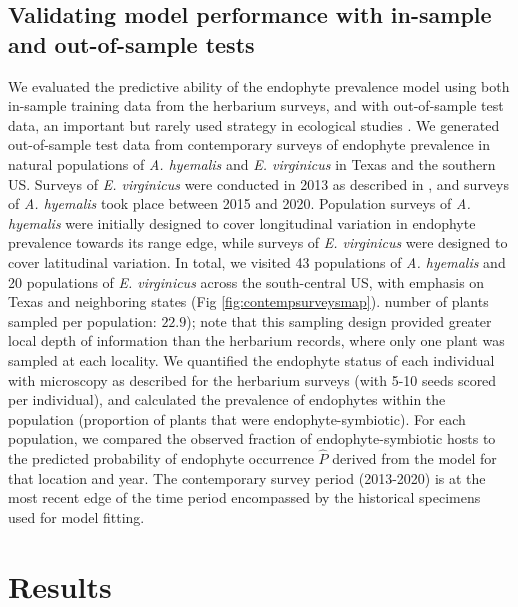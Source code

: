 \documentclass[11pt]{article}
\let\cite\citep
\begin{document}
\subsection*{Validating model performance with in-sample and out-of-sample tests}
We evaluated the predictive ability of the endophyte prevalence model using both in-sample training data from the herbarium surveys, and with out-of-sample test data, an important but rarely used strategy in ecological studies \cite{tredennick2021practical, lee2024phenological}.
We generated out-of-sample test data from contemporary surveys of endophyte prevalence in natural populations of \emph{A. hyemalis} and \emph{E. virginicus} in Texas and the southern US. 
Surveys of \emph{E. virginicus} were conducted in 2013 as described in \citet{sneck2017variation}, and surveys of \emph{A. hyemalis} took place between 2015 and 2020.
Population surveys of \emph{A. hyemalis} were initially designed to cover longitudinal variation in endophyte prevalence towards its range edge, while surveys of \emph{E. virginicus} were designed to cover latitudinal variation. 
In total, we visited 43 populations of \emph{A. hyemalis} and 20 populations of \emph{E. virginicus} across the south-central US, with emphasis on Texas and neighboring states (Fig \ref{fig:contempsurveysmap}).
number of plants sampled per population: $22.9$); note that this sampling design provided greater local depth of information than the herbarium records, where only one plant was sampled at each locality.
We quantified the endophyte status of each individual with microscopy as described for the herbarium surveys (with 5-10 seeds scored per individual), and calculated the prevalence of endophytes within the population (proportion of plants that were endophyte-symbiotic).
For each population, we compared the observed fraction of endophyte-symbiotic hosts to the predicted probability of endophyte occurrence $\hat{P}$ derived from the model for that location and year. 
The contemporary survey period (2013-2020) is at the most recent edge of the time period encompassed by the historical specimens used for model fitting. 

		
\section*{Results}
\end{document}
